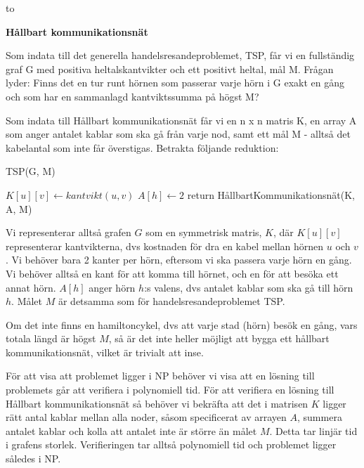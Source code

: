 \documentclass[11pt]{exam}
\begin{document}
\lstset{language=Python,numbers=left}
\hbox to \textwidth{Namn:\enspace\hrulefill} 
\vspace{2 cm} 

\begin{questions}

\question \textbf{Hållbart kommunikationsnät}

Som indata till det generella handelsresandeproblemet, TSP, får vi en fullständig graf G med positiva heltalskantvikter och ett positivt heltal, mål M. Frågan lyder: Finns det en tur runt hörnen som passerar varje hörn i G exakt en gång och som har en sammanlagd kantviktssumma på högst M? 

Som indata till Hållbart kommunikationsnät får vi en n x n matris K, en array A som anger antalet kablar som ska gå från varje nod, samt ett mål M - alltså det kabelantal som inte får överstigas. Betrakta följande reduktion:

\begin{algorithm}
	\caption{TSP(G, M)}
	\begin{algorithmic}
			\STATE $K[u][v] \leftarrow kantvikt(u,v)$ 
		\ENDFOR
			\STATE $A[h] \leftarrow 2$ 
		\ENDFOR
		\STATE return HållbartKommunikationsnät(K, A, M)
	\end{algorithmic}
\end{algorithm}

Vi representerar alltså grafen $G$ som en symmetrisk matris, $K$, där $K[u][v]$ representerar kantvikterna, dvs kostnaden för dra en kabel mellan hörnen $u$ och $v$. Vi behöver bara 2 kanter per hörn, eftersom vi ska passera varje hörn en gång. Vi behöver alltså en kant för att komma till hörnet, och en för att besöka ett annat hörn. $A[h]$ anger hörn $h$:s valens, dvs antalet kablar som ska gå till hörn $h$. Målet $M$ är detsamma som för handelsresandeproblemet TSP.

Om det inte finns en hamiltoncykel, dvs att varje stad (hörn) besök en gång, vars totala längd är högst $M$, så är det inte heller möjligt att bygga ett hållbart kommunikationsnät, vilket är trivialt att inse.

För att visa att problemet ligger i NP behöver vi visa att en lösning till problemets går att verifiera i polynomiell tid. För att verifiera en lösning till Hållbart kommunikationsnät så behöver vi bekräfta att det i matrisen $K$ ligger rätt antal kablar mellan alla noder, såsom specificerat av arrayen $A$, summera antalet kablar och kolla att antalet inte är större än målet $M$. Detta tar linjär tid i grafens storlek. Verifieringen tar alltså polynomiell tid och problemet ligger således i NP.


\end{questions}
\end{document}
